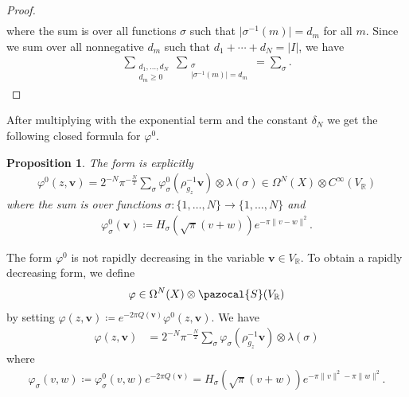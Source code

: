 \documentclass[a4paper,11pt]{amsart} %
\newcommand{\8}{\infty}
\newcommand{\vbf}{\mathbf{v}}
\newcommand{\R}{\mathbb{R}}
\newcommand{\Scal}{\pazocal{S}}
\theoremstyle{mytheoremstyle}
\newtheorem{prop}[thm]{Proposition}
\theoremstyle{remark}
\numberwithin{equation}{section}
\begin{document}
\begin{proof}
\begin{align}
\end{align}
where the sum is over all functions $\sigma$ such that $\vert \sigma^{-1}(m) \vert =d_m$ for all $m$. Since we sum over all nonnegative $d_m$ such that $d_1+ \cdots + d_N=\vert I \vert$, we have
\begin{align}
\sum_{\substack{d_1, \dots,d_N \\ d_m \geq0}}\sum_{\substack{\sigma \\ \vert \sigma^{-1}(m) \vert =d_m}}=\sum_{\sigma }.
\end{align}
\end{proof}
After multiplying with the exponential term and the constant $\delta_N$ we get the following closed formula for $\varphi^0$.
\begin{prop} \label{explicitphihat}
    The form is explicitly
    \begin{align}
    \varphi^0(z,\vbf)= 2^{-N}\pi^{-\frac{N}{2}}\sum_{\sigma}\varphi^0_\sigma(\rho_{g_z}^{-1}\vbf) \otimes \lambda(\sigma) \in \Omega^N(X) \otimes C^\8(V_\R)
\end{align}
where the sum is over functions $\sigma \colon \{ 1, \dots, N \} \longrightarrow \{ 1, \dots, N \}$
and
\begin{align}
    \varphi^0_\sigma(\vbf)\coloneqq H_\sigma\left (\sqrt{\pi}(v+w) \right ) e^{-\pi  \lVert v- w \rVert^2}.
\end{align}
\end{prop}

The form $\varphi^0$ is not rapidly decreasing in the variable $\vbf \in V_\R$. To obtain a rapidly decreasing form, we define 
\begin{align}
\varphi \in \Omega^N(X) \otimes \Scal(V_\R)
\end{align} by  setting $\varphi(z,\vbf) \coloneqq e^{-2\pi Q(\vbf)}\varphi^0(z,\vbf).$
We have
\begin{align} 
\varphi(z,\vbf) %
& = 2^{-N}\pi^{-\frac{N}{2}}\sum_{\sigma}\varphi_\sigma(\rho_{g_z}^{-1}\vbf) \otimes \lambda(\sigma)
\end{align}
where
\begin{align}
    \varphi_\sigma(v,w) \coloneqq  \varphi^0_\sigma(v,w)e^{-2\pi Q(\vbf)} = H_\sigma\left (\sqrt{\pi}(v+w) \right ) e^{-\pi  \lVert v \rVert^2- \pi \lVert w \rVert^2}.
\end{align}
\end{document}
